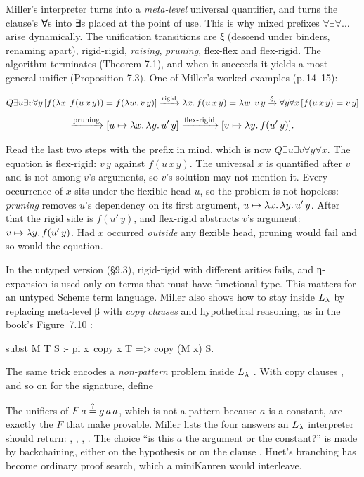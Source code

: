 Miller's interpreter turns  into a \emph{meta-level} universal quantifier, and
 turns the clause's ∀s into ∃s placed at the point of use. This is why mixed
prefixes $\forall\exists\forall\dots$ arise dynamically. The unification transitions are ξ (descend
under binders, renaming apart), rigid-rigid, \emph{raising}, \emph{pruning}, flex-flex and flex-rigid.
The algorithm terminates (Theorem 7.1), and when it succeeds it yields a most general unifier
(Proposition 7.3). One of Miller's worked examples (p.\,14--15):
\begin{fullwidth}
\[
  Q\exists u\exists v\forall y\,[f(\lambda x.\,f(u\,x\,y))=f(\lambda w.\,v\,y)]
  \xrightarrow{\text{rigid}}\lambda x.\,f(u\,x\,y)=\lambda w.\,v\,y
  \xrightarrow{\xi}\forall y\forall x\,[f(u\,x\,y)=v\,y]
\]
\[
  \xrightarrow{\text{pruning}}[u\mapsto\lambda x.\,\lambda y.\,u'\,y]
  \xrightarrow{\text{flex-rigid}}[v\mapsto\lambda y.\,f(u'\,y)].
\]
\end{fullwidth}
Read the last two steps with the prefix in mind, which is now $Q\exists u\exists v\forall y\forall x$. The
equation is flex-rigid: $v\,y$ against $f(u\,x\,y)$. The universal $x$ is quantified after $v$ and is not
among $v$'s arguments, so $v$'s solution may not mention it. Every occurrence of $x$ sits under the
flexible head $u$, so the problem is not hopeless: \emph{pruning} removes $u$'s dependency on its first
argument, $u\mapsto\lambda x.\,\lambda y.\,u'\,y$. After that the rigid side is $f(u'\,y)$, and flex-rigid
abstracts $v$'s argument: $v\mapsto\lambda y.\,f(u'\,y)$. Had $x$ occurred \emph{outside} any flexible
head, pruning would fail and so would the equation.

In the untyped version (§9.3), rigid-rigid with different arities fails, and η-expansion is used only
on terms that must have functional type. This matters for an untyped Scheme term language. Miller also
shows how to stay inside $L_\lambda$ by replacing meta-level β with \emph{copy clauses} and hypothetical
reasoning, as in the book's Figure~7.10 :

\begin{lprolog}
subst M T S :- pi x\ copy x T => copy (M x) S.
\end{lprolog}

\noindent The same trick encodes a \emph{non-pattern} problem inside $L_\lambda$ \cite[§10.3, p.\,30--31]{Miller1991}.
With copy clauses ,  and so on for the
signature, define
\noindent The unifiers of $F\,a\stackrel{?}{=} g\,a\,a$, which is not a pattern because $a$ is a constant, are exactly
the $F$ that make  provable. Miller lists the four answers an $L_\lambda$
interpreter should return: , , , . The choice
\enquote{is this $a$ the argument or the constant?} is made by backchaining, either on the hypothesis
 or on the clause . Huet's branching has become ordinary proof
search, which a miniKanren would interleave.

